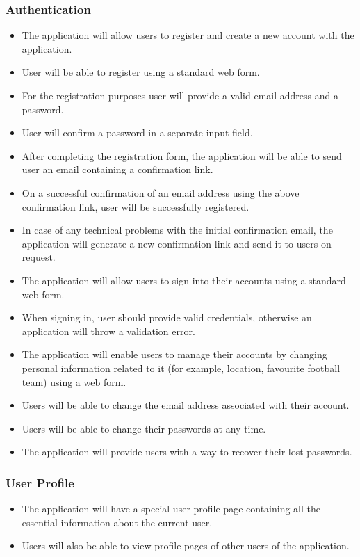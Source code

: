 \subsubsection*{Authentication}
\begin{itemize}
  	\item The application will allow users to register and create a new account with the application.
  	\item User will be able to register using a standard web form.
  	\item For the registration purposes user will provide a valid email address and a password.
  	\item User will confirm a password in a separate input field.
  	\item After completing the registration form, the application will be able to send user an email containing a confirmation link.
  	\item On a successful confirmation of an email address using the above confirmation link, user will be successfully registered.
  	\item In case of any technical problems with the initial confirmation email, the application will generate a new confirmation link and send it to users on request.
	\item The application will allow users to sign into their accounts using a standard web form.
	\item When signing in, user should provide valid credentials, otherwise an application will throw a validation error.
	\item The application will enable users to manage their accounts by changing personal information related to it (for example, location, favourite football team) using a web form.
	\item Users will be able to change the email address associated with their account.
	\item Users will be able to change their passwords at any time.  
	\item The application will provide users with a way to recover their lost passwords.
\end{itemize}

\subsubsection*{User Profile}
\begin{itemize}
	\item The application will have a special user profile page containing all the essential information about the current user.
	\item Users will also be able to view profile pages of other users of the application.
\end{itemize}

